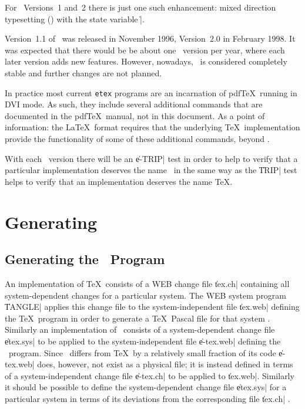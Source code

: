 \documentclass[11pt]{article}
\begin{document}
For \eTeX\ Versions~1 and~2 there is just one such enhancement:  mixed
direction typesetting (\hbox{\TeXXeT}) with the state variable \|\TeXXeTstate|.

Version~1.1 of \eTeX\ was released in November 1996, Version~2.0 in
February 1998.
It was expected that there would be be about one \eTeX\ version per year,
where each later version adds new features.  However, nowadays, \eTeX\
is considered completely stable and further changes are not planned.

In practice most current \texttt{etex} programs are an incarnation of
pdf\TeX\ running in DVI mode. As such, they include several additional
commands that are documented in the pdf\TeX\ manual, not in this
document. As a point of information: the \LaTeX\ format requires that
the underlying \TeX\ implementation provide the functionality of some of
these additional commands, beyond \eTeX.

With each \eTeX\ version there will be an \|e-TRIP| test \cite{etripman}
in order to help to verify that a particular implementation deserves the
name \eTeX\ in the same way as the \|TRIP| test \cite{tripman} helps to
verify that an implementation deserves the name \TeX.

\section{Generating \eTeX}

\subsection{Generating the \eTeX\ Program}

An implementation of \TeX\ consists of a WEB change file \|tex.ch|
containing all system-dependent changes for a particular system.  The
WEB system program \|TANGLE| applies this change file to the
system-independent file \|tex.web| defining the \TeX\ program in order to
generate a \TeX\ Pascal file for that system \cite{webman}.  Similarly
an implementation of \eTeX\ consists of a system-dependent change file
\|etex.sys| to be applied to the system-independent file \|e-tex.web|
defining the \eTeX\ program.  Since \eTeX\ differs from \TeX\ by a
relatively small fraction of its code \|e-tex.web| does, however, not
exist as a physical file; it is instead defined in terms of a
system-independent change file \|e-tex.ch| to be applied to \|tex.web|.
Similarly it should be possible to define the system-dependent change
file \|etex.sys| for a particular system in terms of its deviations
from the corresponding file \|tex.ch| \cite{etexgen}.
\end{document}
